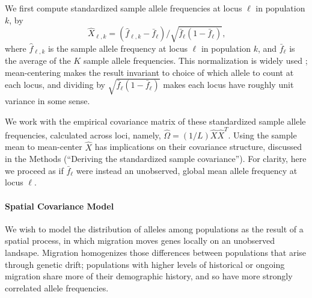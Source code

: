 \documentclass[12pt]{article}
\begin{document}
We first compute standardized sample allele frequencies at locus $\ell$ in population $k$, by
\begin{equation}
  \label{eq:standardized_sample_freqs}
  \hat{X}_{\ell,k} = (\hat{f}_{\ell,k}  - \bar{f}_{\ell})/\sqrt{\bar{f}_{\ell}(1-\bar{f}_{\ell})}\text{,}
\end{equation}
where $\hat{f}_{\ell,k}$ is the sample allele frequency at locus $\ell$ in population $k$, 
and $\bar{f}_{\ell}$ is the average of the $K$ sample allele frequencies.
This normalization is widely used \citep[e.g.][]{nicholson2002,Patterson2006};
mean-centering makes the result invariant to choice of which allele to count at each locus,
and dividing by $\sqrt{\bar{f}_{\ell}(1-\bar{f}_{\ell})}$ makes each locus have roughly unit variance in some sense.

We work with the empirical covariance matrix of these standardized sample allele frequencies,
calculated across loci, namely, $\widehat{\Omega} = (1/L)  \hat{X}\hat{X}^T$.
Using the sample mean to mean-center $\hat X$ has implications on their covariance structure, discussed in the Methods 
(``Deriving the standardized sample covariance'').
For clarity, here we proceed as if $\bar{f}_{\ell}$ were instead an unobserved, global mean allele frequency at locus $\ell$.

\paragraph{Spatial Covariance Model}
We wish to model the distribution of alleles among populations as the result of a spatial process, 
in which migration moves genes locally on an unobserved landsape.
Migration homogenizes those differences between populations that arise through genetic drift;
populations with higher levels of historical or ongoing migration share more of their demographic history,
and so have more strongly correlated allele frequencies.
\end{document}
